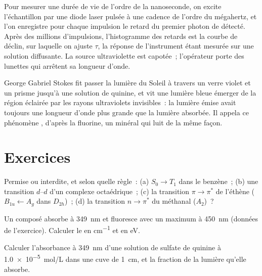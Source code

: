 \begin{inthelab}
Pour mesurer une durée de vie de l'ordre de la nanoseconde, on excite
l'échantillon par une diode laser pulsée à une cadence de l'ordre du
mégahertz, et l'on enregistre pour chaque impulsion le retard du premier
photon de  détecté. Après des millions d'impulsions,
l'histogramme des retards est la courbe de déclin, sur laquelle on ajuste
$\tau$, la réponse de l'instrument étant mesurée sur une solution
diffusante. La source ultraviolette est capotée~; l'opérateur porte des
lunettes qui arrêtent sa longueur d'onde.
\end{inthelab}

\begin{history}[Stokes, 1852]
George Gabriel Stokes fit passer la lumière du Soleil à travers un verre
violet et un prisme jusqu'à une solution de quinine, et vit une lumière
bleue émerger de la région éclairée par les rayons ultraviolets
invisibles~: la lumière émise avait toujours une longueur d'onde plus
grande que la lumière absorbée. Il appela ce phénomène ,
d'après la fluorine, un minéral qui luit de la même façon.
\end{history}

\section{Exercices}

\begin{exercise}[$\star$]\label{exo:b3:electronic-spectroscopy:1}
Permise ou interdite, et selon quelle règle~: (a) $S_0 \to T_1$ dans le
benzène~; (b) une transition $d$--$d$ d'un complexe octaédrique~; (c) la
transition $\pi\to\pi^*$ de l'éthène
($B_{1u} \leftarrow A_g$ dans $D_{2h}$)~; (d) la transition $n\to\pi^*$
du méthanal
($A_2$)~?
\end{exercise}

\begin{exercise}[$\star$]\label{exo:b3:electronic-spectroscopy:2}
Un composé absorbe à \qty{349}{nm} et fluoresce avec un maximum à
\qty{450}{nm} (données de l'exercice). Calculer le 
en \unit{cm^{-1}} et en
eV.
\end{exercise}

\begin{exercise}[$\star$]\label{exo:b3:electronic-spectroscopy:3}
Calculer l'absorbance à \qty{349}{nm} d'une solution de sulfate de
quinine à \qty{1.0e-5}{mol/L} dans une cuve de \qty{1}{cm}, et la
fraction de la lumière qu'elle absorbe.
\end{exercise}

